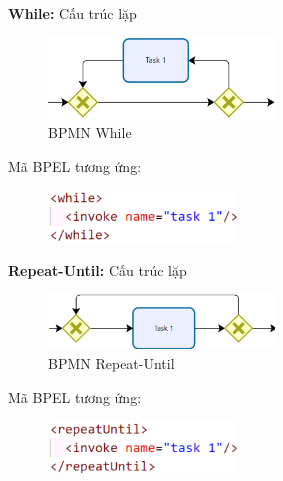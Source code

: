 \newpage
\textbf{While:} Cấu trúc lặp
\begin{figure}[!htp]
    \begin{center}
        \includegraphics[width=6cm]{img/Theory/tranfer/while.png}
    \end{center}
    \caption{BPMN  While}
\end{figure}
\par Mã BPEL tương ứng:
\begin{figure}[!htp]
    \begin{center}
        \includegraphics[width=5cm]{img/Theory/tranfer/whileCode.png}
    \end{center}
\end{figure}


\textbf{Repeat-Until:} Cấu trúc lặp
\begin{figure}[!htp]
    \begin{center}
        \includegraphics[width=6cm]{img/Theory/tranfer/repeat-until.png}
    \end{center}
    \caption{BPMN Repeat-Until}
\end{figure}
\par Mã BPEL tương ứng:
\begin{figure}[!htp]
    \begin{center}
        \includegraphics[width=5cm]{img/Theory/tranfer/repeat-untilCode.png}
    \end{center}
\end{figure}


